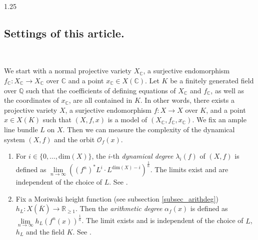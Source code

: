 \documentclass[12pt]{amsart}
\newcommand{\mb}[1]{\mathbb{#1}}
\newcommand\ra{\rightarrow}
\begin{document}
\begin{spacing}{1.25}

\subsection*{Settings of this article.}

\ 

We start with a normal projective variety $X_{\mathbb{C}}$, a surjective endomorphism $f_{\mb{C}}:X_{\mathbb{C}}\ra X_{\mathbb{C}}$ over $\mathbb{C}$ and a point $x_{\mb{C}}\in X(\mb{C})$. Let $K$ be a finitely generated field over $\mathbb{Q}$ such that the coefficients of defining equations of $X_{\mathbb{C}}$ and $f_{\mb{C}}$, as well as the coordinates of $x_{\mb{C}}$, are all contained in $K$. In other words, there exists a projective variety $X$, a surjective endomorphism $f: X\ra X$ over $K$, and a point $x\in X(K)$ such that $(X,f,x)$ is a model of $(X_{\mathbb{C}},f_{\mb{C}}, x_{\mb{C}})$. We fix an ample line bundle $L$ on $X$. Then we can measure the complexity of the dynamical system $(X,f)$ and the orbit $\mathcal{O}_f(x)$.
\begin{enumerate}
\item
For $i\in\{0,\dots,\mathrm{dim}(X)\}$, the $i$-th \emph{dynamical degree} $\lambda_i(f)$ of $(X,f)$ is defined as $\lim\limits_{n\rightarrow\infty}((f^n)^{*}L^i\cdot L^{\mathrm{dim}(X)-i})^{\frac{1}{n}}$. The limits exist and are independent of the choice of $L$. See \cite{DS05,Dan20,Tru20}.

\item
Fix a Moriwaki height function (see subsection \ref{subsec_arithdeg}) $h_{L}:X(\overline{K})\rightarrow\mathbb{R}_{\geq1}$. Then the \emph{arithmetic degree} $\alpha_f(x)$ is defined as $\lim\limits_{n\rightarrow\infty}h_{L}(f^n(x))^{\frac{1}{n}}$. The limit exists and is independent of the choice of $L$, $h_L$ and the field $K$. See \cite{KS16,Oh22,LS24}.
\end{enumerate}


\end{spacing}
\end{document}
